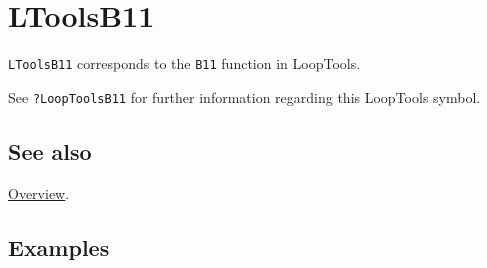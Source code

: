\documentclass[../FeynHelpersManual.tex]{subfiles}
\begin{document}
\hypertarget{ltoolsb11}{
\section{LToolsB11}\label{ltoolsb11}}

\texttt{LToolsB11} corresponds to the \texttt{B11} function in
LoopTools.

See \texttt{?LoopTools\textasciigrave B11} for further information
regarding this LoopTools symbol.

\subsection{See also}

\hyperlink{toc}{Overview}.

\subsection{Examples}
\end{document}

